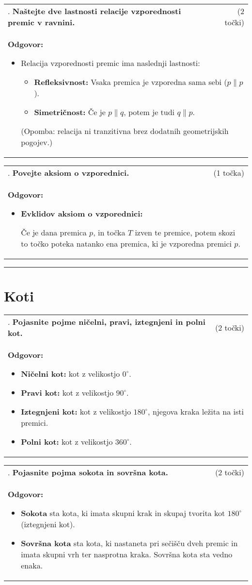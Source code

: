 \documentclass[12pt]{article}
\newcounter{vprasanje}[section]
\renewcommand{\thevprasanje}{\roman{vprasanje}}
\newcommand{\vprasanje}[2]{%
  \stepcounter{vprasanje}%
  \textbf{\thevprasanje}. \textbf{#1} & (#2) \\
}
\newcommand{\odgovor}[1]{%
  \multicolumn{2}{p{\dimexpr\textwidth-2\tabcolsep\relax}}{%
    \small \textbf{Odgovor:} #1%
  } \\[1em]%
}
\newcommand{\crta}{\rule{\textwidth}{0.4pt}}
\newcommand{\naslov}[1]{%
  \vspace{1em} 
  \section{#1}
  \addcontentsline{toc}{section}{\protect\numberline{}#1}%
}
\newcommand{\razmak}[1]{%
  \vspace{#1}
}
\begin{document}
\begin{tabularx}{\textwidth}{X r}
\vprasanje{Naštejte dve lastnosti relacije vzporednosti premic v ravnini.}{2 točki}
\odgovor{%
\begin{itemize}
	\item Relacija vzporednosti premic ima naslednji lastnosti:
	\begin{itemize}
	  \item \textbf{Refleksivnost:} Vsaka premica je vzporedna sama sebi ($p \parallel p$).
	  \item \textbf{Simetričnost:} Če je $p \parallel q$, potem je tudi $q \parallel p$.
	\end{itemize}
	(Opomba: relacija ni tranzitivna brez dodatnih geometrijskih pogojev.)
\end{itemize}
}
\end{tabularx}

\begin{tabularx}{\textwidth}{X r}
\vprasanje{Povejte aksiom o vzporednici.}{1 točka}
\odgovor{%
\begin{itemize}
	\item \textbf{Evklidov aksiom o vzporednici:}

Če je dana premica $p$, in točka $T$ izven te premice, potem skozi to točko poteka natanko ena premica, ki je vzporedna premici $p$.
\end{itemize}
}
\end{tabularx}

\razmak{0.5em}


\crta

\naslov{Koti}

\begin{tabularx}{\textwidth}{X r}
\vprasanje{Pojasnite pojme ničelni, pravi, iztegnjeni in polni kot.}{2 točki}
\odgovor{%
\begin{itemize}
  \item \textbf{Ničelni kot:} kot z velikostjo $0^\circ$.
  \item \textbf{Pravi kot:} kot z velikostjo $90^\circ$.
  \item \textbf{Iztegnjeni kot:} kot z velikostjo $180^\circ$, njegova kraka ležita na isti premici.
  \item \textbf{Polni kot:} kot z velikostjo $360^\circ$.
\end{itemize}
}
\end{tabularx}

\begin{tabularx}{\textwidth}{X r}
\vprasanje{Pojasnite pojma sokota in sovršna kota.}{2 točki}
\odgovor{%
\begin{itemize}
	\item \textbf{Sokota} sta kota, ki imata skupni krak in skupaj tvorita kot $180^\circ$ (iztegnjeni kot).
	\item \textbf{Sovršna kota} sta kota, ki nastaneta pri sečišču dveh premic in imata skupni vrh ter nasprotna kraka. Sovršna kota sta vedno enaka.
\end{itemize}
}
\end{tabularx}
\end{document}
